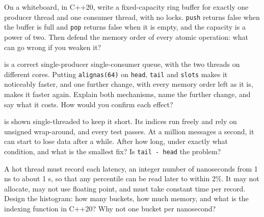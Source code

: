 \begin{question}\label{iq:iv3:low-latency:21}
On a whiteboard, in C++20, write a fixed-capacity ring buffer for exactly one producer thread and one consumer thread, with no locks. \texttt{push} returns false when the buffer is full and \texttt{pop} returns false when it is empty, and the capacity is a power of two. Then defend the memory order of every atomic operation: what can go wrong if you weaken it?
\end{question}

\begin{question}\label{iq:iv3:low-latency:22}
 is a correct single-producer single-consumer queue, with the two threads on different cores. Putting \texttt{alignas(64)} on \texttt{head}, \texttt{tail} and \texttt{slots} makes it noticeably faster, and one further change, with every memory order left as it is, makes it faster again. Explain both mechanisms, name the further change, and say what it costs. How would you confirm each effect?
\label{lst:iv3:ll:adjacent}
\end{question}

\begin{question}\label{iq:iv3:low-latency:23}
 is shown single-threaded to keep it short. Its indices run freely and rely on unsigned wrap-around, and every test passes. At a million messages a second, it can start to lose data after a while. After how long, under exactly what condition, and what is the smallest fix? Is \texttt{tail - head} the problem?
\label{lst:iv3:ll:wrap}
\end{question}

\begin{question}\label{iq:iv3:low-latency:24}
A hot thread must record each latency, an integer number of nanoseconds from 1 ns to about 1 s, so that any percentile can be read later to within 2\%. It may not allocate, may not use floating point, and must take constant time per record. Design the histogram: how many buckets, how much memory, and what is the indexing function in C++20? Why not one bucket per nanosecond?
\end{question}

